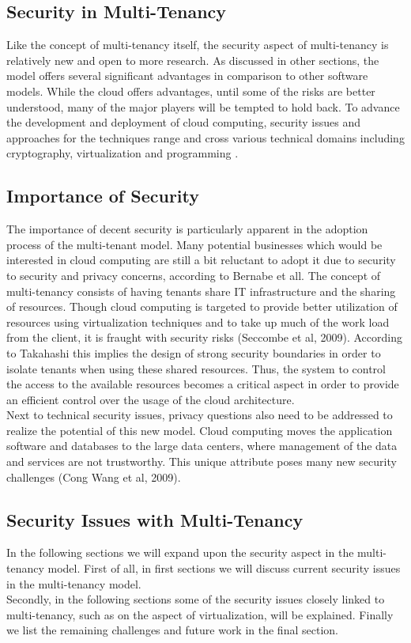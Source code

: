\subsection{Security in Multi-Tenancy}
Like the concept of multi-tenancy itself, the security aspect of multi-tenancy is relatively new and open to more research. As discussed in other sections, the model offers several significant advantages in comparison to other software models. While the cloud offers advantages, until some of the risks are better understood, many of the major players will be tempted to hold back. To advance the development and deployment of cloud computing, security issues and approaches for the techniques range and cross various technical domains including cryptography, virtualization and programming \cite{Takahashi2012Security}.

\subsection{Importance of Security}
The importance of decent security is particularly apparent in the adoption process of the multi-tenant model. Many potential businesses which would be interested in cloud computing are still a bit reluctant to adopt it due to security to security and privacy concerns, according to Bernabe et all\cite{Bernabe2012Auth}. The concept of multi-tenancy consists of having tenants share IT infrastructure and the sharing of resources. Though cloud computing is targeted to provide better utilization of resources using virtualization techniques and to take up much of the work load from the client, it is fraught with security risks (Seccombe et al, 2009). According to Takahashi\cite{Takahashi2012Security} this implies the design of strong security boundaries in order to isolate tenants when using these shared resources. Thus, the system to control the access to the available resources becomes a critical aspect in order to provide an efficient control over the usage of the cloud architecture. \\
Next to technical security issues, privacy questions also need to be addressed to realize the potential of this new model. Cloud computing moves the application software and databases to the large data centers, where management of the data and services are not trustworthy. This unique attribute poses many new security challenges (Cong Wang et al, 2009). 

\subsection{Security Issues with Multi-Tenancy}
In the following sections we will expand upon the security aspect in the multi-tenancy model. First of all, in first sections we will discuss current security issues in the multi-tenancy model. \\
Secondly, in the following sections some of the security issues closely linked to multi-tenancy, such as on the aspect of virtualization, will be explained. Finally we list the remaining challenges and future work in the final section.

